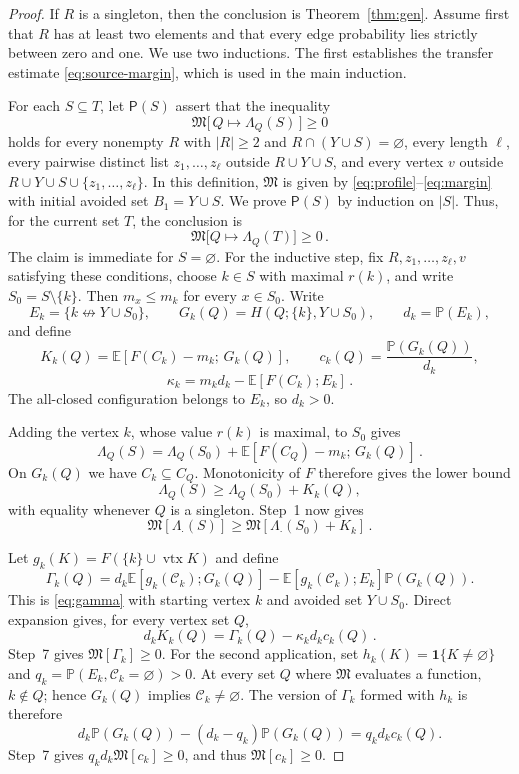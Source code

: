 \documentclass[11pt]{article}
\theoremstyle{definition}
\theoremstyle{remark}
\newcommand{\PP}{\mathbb P}
\newcommand{\EE}{\mathbb E}
\newcommand{\one}{\mathbf 1}
\newcommand{\ncon}{\nleftrightarrow}
\newcommand{\eC}{\mathcal C}
\DeclareMathOperator{\vtx}{vtx}
\newcommand{\Marg}{\mathfrak M}
\begin{document}
\begin{proof}
If $R$ is a singleton, then the conclusion is Theorem~\ref{thm:gen}. Assume first that $R$ has
at least two elements and that every edge probability lies strictly between zero and one.
We use two inductions. The first establishes the transfer estimate
\eqref{eq:source-margin}, which is used in the main induction.

For each $S\subseteq T$, let $\mathsf P(S)$ assert that the inequality
\[
 \Marg\bigl[\,Q\mapsto\Lambda_Q(S)\,\bigr]\geq0
\]
holds for every nonempty $R$ with
$|R|\geq2$ and $R\cap(Y\cup S)=\varnothing$, every length $\ell$, every pairwise distinct
list $z_1,\ldots,z_\ell$ outside $R\cup Y\cup S$, and every vertex $v$ outside
$R\cup Y\cup S\cup\{z_1,\ldots,z_\ell\}$. In this
definition, $\Marg$ is given by \eqref{eq:profile}--\eqref{eq:margin} with initial
avoided set $B_1=Y\cup S$. We prove $\mathsf P(S)$ by induction on $|S|$. Thus, for the
current set $T$, the conclusion is
\begin{equation}\label{eq:source-margin}
 \Marg\bigl[Q\mapsto\Lambda_Q(T)\bigr]\geq0\,.
\end{equation}
The claim is immediate for $S=\varnothing$. For the inductive step, fix
$R,z_1,\ldots,z_\ell,v$ satisfying these conditions, choose $k\in S$ with maximal
$r(k)$, and write
$S_0=S\setminus\{k\}$. Then $m_x\leq m_k$ for every $x\in S_0$.
Write
\[
 E_k=\{k\ncon Y\cup S_0\},\qquad
 G_k(Q)=H(Q;\{k\},Y\cup S_0),\qquad d_k=\PP(E_k),
\]
and define
\[
 K_k(Q)=\EE[F(C_k)-m_k;\,G_k(Q)],\qquad
 c_k(Q)=\frac{\PP(G_k(Q))}{d_k},
\]
\[
 \kappa_k=m_kd_k-\EE[F(C_k);E_k]\,.
\]
The all-closed configuration belongs to $E_k$, so $d_k>0$.

Adding the vertex $k$, whose value $r(k)$ is maximal, to $S_0$ gives
\[
 \Lambda_Q(S)=\Lambda_Q(S_0)
   +\EE[F(C_Q)-m_k;\,G_k(Q)]\,.
\]
On $G_k(Q)$ we have $C_k\subseteq C_Q$. Monotonicity of $F$ therefore gives the lower
bound
\[
 \Lambda_Q(S)\geq\Lambda_Q(S_0)+K_k(Q),
\]
with equality whenever $Q$ is a singleton. Step~1 now gives
\begin{equation}\label{eq:source-peel-margin}
 \Marg[\Lambda_\cdot(S)]
 \geq \Marg[\Lambda_\cdot(S_0)+K_k]\,.
\end{equation}

Let $g_k(K)=F(\{k\}\cup\vtx K)$ and define
\[
 \Gamma_k(Q)=d_k\EE[g_k(\eC_k);G_k(Q)]
 -\EE[g_k(\eC_k);E_k]\PP(G_k(Q)).
\]
This is \eqref{eq:gamma} with starting vertex $k$ and avoided set $Y\cup S_0$. Direct
expansion gives, for every vertex set $Q$,
\begin{equation}\label{eq:source-kappa-covariance}
 d_kK_k(Q)=\Gamma_k(Q)-\kappa_kd_kc_k(Q)\,.
\end{equation}
Step~7 gives $\Marg[\Gamma_k]\geq0$. For the second application, set
$h_k(K)=\one\{K\neq\varnothing\}$ and
$q_k=\PP(E_k,\eC_k=\varnothing)>0$. At every set $Q$ where $\Marg$ evaluates a function,
$k\notin Q$; hence $G_k(Q)$ implies $\eC_k\neq\varnothing$. The version of $\Gamma_k$
formed with $h_k$ is therefore
\[
 d_k\PP(G_k(Q))-(d_k-q_k)\PP(G_k(Q))
 =q_kd_kc_k(Q).
\]
Step~7 gives $q_kd_k\Marg[c_k]\geq0$, and thus $\Marg[c_k]\geq0$.


\end{proof}
\end{document}
